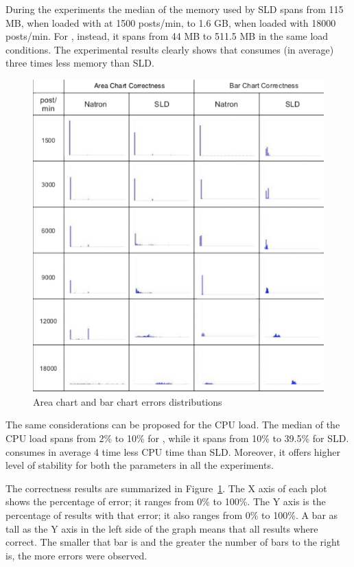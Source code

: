 {During the experiments the median of the  memory used by SLD spans from 115 MB, when loaded with at 1500 posts/min, to 1.6 GB, when loaded with 18000 posts/min. For \sti{}, instead, it spans from 44 MB to 511.5 MB in the same load conditions. The experimental results clearly shows that \sti{} consumes (in average) three times less memory than SLD.

\begin{figure}[p]
\centering
\includegraphics[width=\textwidth]{img/comp-mod-errors}
\caption{Area chart and bar chart errors distributions}
\label{fig:errors}
\end{figure}

The same considerations can be proposed for the CPU load. The median of the CPU load spans  from 2\% to 10\% for \sti{}, while it spans from 10\% to 39.5\% for SLD. \sti{} consumes in average 4 time less CPU time than SLD. 
Moreover, it offers higher level of stability for both the parameters in all the experiments. 

The correctness results are summarized in Figure~\ref{fig:errors}. The X axis of each plot shows the percentage of error; it ranges from 0\% to 100\%. The Y axis is the percentage of results with that error; it also ranges from 0\% to 100\%. A bar as tall as the Y axis in the left side of the graph means that all results where correct. The smaller that bar is and the greater the number of bars to the right is, the more errors were observed.

}
